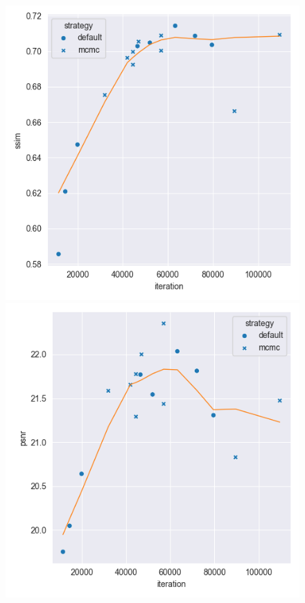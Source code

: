 \begin{figure}[h!]
    \centering
    \begin{minipage}{0.3\textwidth}
        \centering
        \includegraphics[width=\textwidth]{img/gs_metrics/ssim_iteration.png}
    \end{minipage}
    \hfill
    \begin{minipage}{0.3\textwidth}
        \centering
        \includegraphics[width=\textwidth]{img/gs_metrics/psnr_iteration.png}

\end{minipage}
\end{figure}
